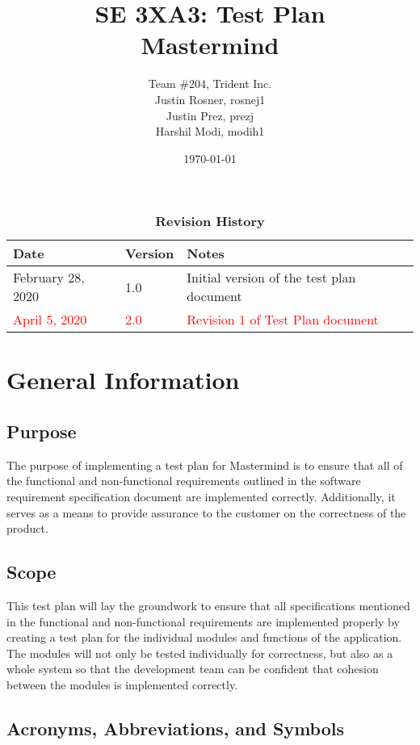 \documentclass[12pt, titlepage]{article}
\title{SE 3XA3: Test Plan\\Mastermind}
\author{Team \#204, Trident Inc.
		\\ Justin Rosner, rosnej1
		\\ Justin Prez, prezj
		\\ Harshil Modi, modih1
}
\date{\today}
\begin{document}
\maketitle

\tableofcontents
\listoftables
\listoffigures

\begin{table}[bp]
\caption{\bf Revision History}
\begin{tabularx}{\textwidth}{p{3cm}p{2cm}X}
\toprule {\bf Date} & {\bf Version} & {\bf Notes}\\
\midrule
February 28, 2020 & 1.0 & Initial version of the test plan document\\ \textcolor{red}{April 5, 2020} & \textcolor{red}{2.0} & \textcolor{red}{Revision 1 of Test Plan document}\\
\bottomrule
\end{tabularx}
\end{table}

\newpage


\section{General Information}

\subsection{Purpose} 
The purpose of implementing a test plan for Mastermind is to ensure that all of the functional and non-functional requirements outlined in the software requirement specification document are implemented correctly. Additionally, it serves as a means to provide assurance to the customer on the correctness of the product. 

\subsection{Scope}
This test plan will lay the groundwork to ensure that all specifications mentioned in the functional and non-functional requirements are implemented properly by creating a test plan for the individual modules and functions of the application. The modules will not only be tested individually for correctness, but also as a whole system so that the development team can be confident that cohesion between the modules is implemented correctly.

\subsection{Acronyms, Abbreviations, and Symbols}
	
\end{document}
